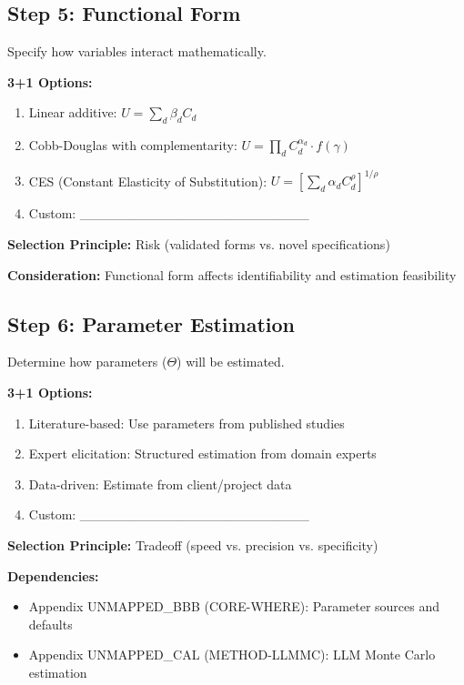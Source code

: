 \subsection{Step 5: Functional Form}

Specify how variables interact mathematically.

\begin{tcolorbox}[colback=white, colframe=black,
    title=Step 5: Functional Form]
\textbf{3+1 Options:}
\begin{enumerate}
\item[$\square$] Linear additive: $U = \sum_d \beta_d C_d$
\item[$\square$] Cobb-Douglas with complementarity: $U = \prod_d C_d^{\alpha_d} \cdot f(\gamma)$
\item[$\square$] CES (Constant Elasticity of Substitution): $U = \left[\sum_d \alpha_d C_d^\rho\right]^{1/\rho}$
\item[$\square$] Custom: \_\_\_\_\_\_\_\_\_\_\_\_\_\_\_\_\_\_\_\_\_\_\_\_
\end{enumerate}

\textbf{Selection Principle:} Risk (validated forms vs. novel specifications)

\textbf{Consideration:} Functional form affects identifiability and estimation feasibility
\end{tcolorbox}

\subsection{Step 6: Parameter Estimation}

Determine how parameters ($\Theta$) will be estimated.

\begin{tcolorbox}[colback=white, colframe=black,
    title=Step 6: Parameter Estimation]
\textbf{3+1 Options:}
\begin{enumerate}
\item[$\square$] Literature-based: Use parameters from published studies
\item[$\square$] Expert elicitation: Structured estimation from domain experts
\item[$\square$] Data-driven: Estimate from client/project data
\item[$\square$] Custom: \_\_\_\_\_\_\_\_\_\_\_\_\_\_\_\_\_\_\_\_\_\_\_\_
\end{enumerate}

\textbf{Selection Principle:} Tradeoff (speed vs. precision vs. specificity)

\textbf{Dependencies:}
\begin{itemize}[nosep]
\item Appendix UNMAPPED_BBB (CORE-WHERE): Parameter sources and defaults
\item Appendix UNMAPPED_CAL (METHOD-LLMMC): LLM Monte Carlo estimation
\end{itemize}
\end{tcolorbox}


